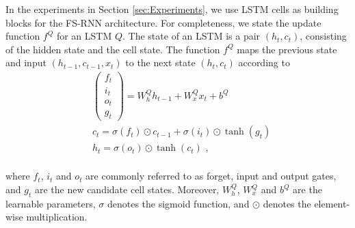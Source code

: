 \documentclass{article}
\begin{document}
In the experiments in Section \ref{sec:Experiments}, we use LSTM cells as building blocks for the FS-RNN architecture. For completeness, we state the update function $f^Q$ for an LSTM $Q$. The state of an LSTM is a pair $(h_t, c_t)$, consisting of the hidden state and the cell state.  The function $f^Q$ maps the previous state and input $(h_{t-1}, c_{t-1}, x_t)$ to the next state $(h_t,c_t)$ according to
\begin{align*}
&\begin{pmatrix}f_t\\i_t\\o_t\\g_t\end{pmatrix} = W^Q_h h_{t-1} + W^Q_x x_t + b^Q\\
&c_t = \sigma (f_t) \odot c_{t-1} + \sigma (i_t) \odot \tanh(g_t) \\
&h_t = \sigma (o_t) \odot \tanh(c_t) \text{ ,}\\
\end{align*}

where $f_t$, $i_t$ and $o_t$  are commonly referred to as forget, input and output  gates, and $g_t$ are the new candidate cell states. Moreover, $W^Q_h$, $ W^Q_x$ and $b^Q$ are the learnable parameters, $\sigma$ denotes the sigmoid function, and $\odot$ denotes the element-wise multiplication.

\iffalse
\begin{figure}
    \begin{align*}
&f^Q((h_{t-1}, c_{t-1}), x_t) = (c_t, h_t) \\
    &\begin{pmatrix}f_t\\i_t\\o_t\\g_t\end{pmatrix} = W^Q_h h_{t-1} + W^Q_x x_t + b^Q\\
    &c_t = \sigma (f_t) \odot c_{t-1} + \sigma (i_t) \odot tanh(g_t) \\
    &h_t = \sigma (o_t) \odot tanh(c_t) \\
    \end{align*}
\caption{Formulation of a LSTM where the hidden state is a tuple.}
\end{figure}
\fi








 
\end{document}
